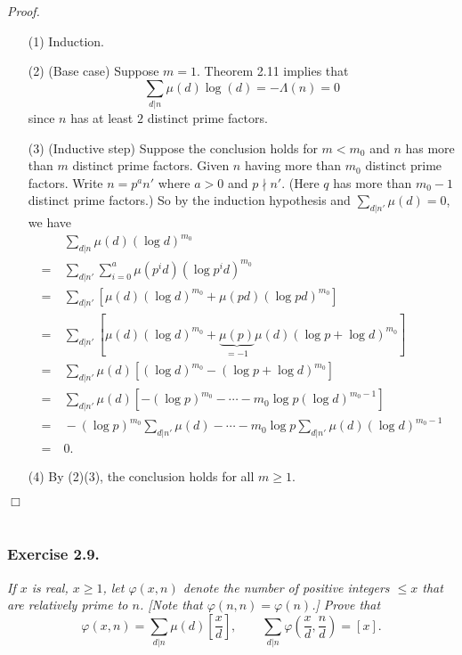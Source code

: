 \documentclass{article}
\begin{document}
\emph{Proof.}
\begin{enumerate}
\item[(1)]
  Induction.

\item[(2)]
  (Base case)
  Suppose $m = 1$.
  Theorem 2.11 implies that
  \[
    \sum_{d|n} \mu(d) \log(d) = - \Lambda(n) = 0
  \]
  since $n$ has at least $2$ distinct prime factors.

\item[(3)]
  (Inductive step)
  Suppose the conclusion holds for $m < m_0$ and $n$ has more than $m$ distinct prime factors.
  Given $n$ having more than $m_0$ distinct prime factors.
  Write $n = p^a n'$ where $a > 0$ and $p \nmid n'$.
  (Here $q$ has more than $m_0 - 1$ distinct prime factors.)
  So by the induction hypothesis and $\sum_{d|n'} \mu(d) = 0$,
  we have
  \begin{align*}
    &\:
    \sum_{d|n} \mu(d) (\log d)^{m_0} \\
    =&\: \sum_{d|n'} \sum_{i = 0}^{a} \mu(p^i d) (\log p^i d)^{m_0} \\
    =&\: \sum_{d|n'} [ \mu(d) (\log d)^{m_0} + \mu(pd) (\log pd)^{m_0} ] \\
    =&\: \sum_{d|n'} [ \mu(d) (\log d)^{m_0}
        + \underbrace{\mu(p)}_{= -1}\mu(d) (\log p + \log d)^{m_0} ] \\
    =&\: \sum_{d|n'} \mu(d) [ (\log d)^{m_0} - (\log p + \log d)^{m_0} ] \\
    =&\: \sum_{d|n'} \mu(d) [ - (\log p)^{m_0} - \cdots - m_0 \log p (\log d)^{m_0 - 1} ] \\
    =&\: - (\log p)^{m_0} \sum_{d|n'} \mu(d) - \cdots
        - m_0 \log p \sum_{d|n'} \mu(d) (\log d)^{m_0 - 1} \\
    =&\: 0.
  \end{align*}

\item[(4)]
  By (2)(3), the conclusion holds for all $m \geq 1$.
\end{enumerate}
$\Box$ \\\\






\subsubsection*{Exercise 2.9.}
\emph{If $x$ is real, $x \geq 1$, let $\varphi(x,n)$ denote
the number of positive integers $\leq x$ that are relatively prime to $n$.
[Note that $\varphi(n,n) = \varphi(n)$.]
Prove that
\[
  \varphi(x,n) = \sum_{d|n} \mu(d) \left[ \frac{x}{d} \right],
  \qquad
  \sum_{d|n} \varphi\left( \frac{x}{d},\frac{n}{d} \right) = [x].
\]}
\end{document}
